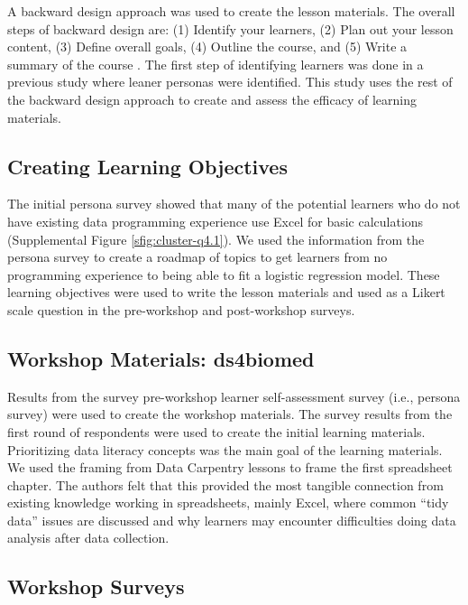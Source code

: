 \documentclass[030-workshop.tex]{subfiles}
\begin{document}
  A backward design approach was used to create the lesson materials.
  The overall steps of backward design are:
  (1) Identify your learners,
  (2) Plan out your lesson content,
  (3) Define overall goals,
  (4) Outline the course, and
  (5) Write a summary of the course
  \cite{wilson2019teaching}.
  The first step of identifying learners was done in a previous study where leaner personas were identified.
  This study uses the rest of the backward design approach to create and assess the efficacy of learning materials.

  \subsection{Creating Learning Objectives}

    The initial persona survey showed that many of the potential learners who do not
    have existing data programming experience use Excel for basic calculations
    (Supplemental Figure \ref{sfig:cluster-q4.1}).
    We used the information from the persona survey to create a roadmap of topics
    to get learners from no programming experience to being able to fit a logistic regression model.
    These learning objectives were used to write the lesson materials
    and used as a Likert scale question in the pre-workshop and post-workshop surveys.

  \subsection{Workshop Materials: ds4biomed}

    Results from the survey pre-workshop learner self-assessment survey (i.e., persona survey)
    were used to create the workshop materials.
    The survey results from the first round of respondents were used to create the initial
    learning materials.
    Prioritizing data literacy concepts was the main goal of the learning materials.
    We used the framing from Data Carpentry lessons to frame the first spreadsheet chapter.
    The authors felt that this provided the most tangible connection from existing knowledge
    working in spreadsheets, mainly Excel,
    where common ``tidy data'' issues are discussed and why learners may encounter difficulties
    doing data analysis after data collection.

  \subsection{Workshop Surveys}
\end{document}
